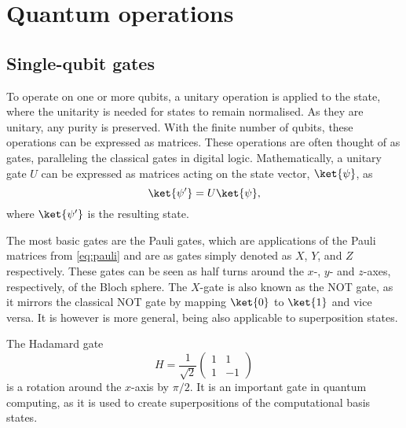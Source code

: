 \section{Quantum operations}
\label{sec:quantum_operations}
\subsection{Single-qubit gates}
To operate on one or more qubits, a unitary operation is applied to the state, where the unitarity is needed for states to remain normalised.
As they are unitary, any purity is preserved.
With the finite number of qubits, these operations can be expressed as matrices.
These operations are often thought of as gates, paralleling the classical gates in digital logic.
Mathematically, a unitary gate $U$ can be expressed as matrices acting on the state vector, $\ket{\psi}$, as
\begin{equation}
    \ket{\psi'} = U\ket{\psi},
\end{equation}
where $\ket{\psi'}$ is the resulting state.

The most basic gates are the Pauli gates, which are applications of the Pauli matrices from \cref{eq:pauli} and are as gates simply denoted as $X$, $Y$, and $Z$ respectively.
These gates can be seen as half turns around the $x$-, $y$- and $z$-axes, respectively, of the Bloch sphere.
The $X$-gate is also known as the NOT gate, as it mirrors the classical NOT gate by mapping $\ket{0}$ to $\ket{1}$ and vice versa.
It is however is more general, being also applicable to superposition states.

The Hadamard gate
\begin{equation}
    H = \frac{1}{\sqrt{2}} \begin{pmatrix} 1 & 1 \\ 1 & -1 \end{pmatrix}
\end{equation}
is a rotation around the $x$-axis by $\pi/2$.
It is an important gate in quantum computing, as it is used to create superpositions of the computational basis states.

